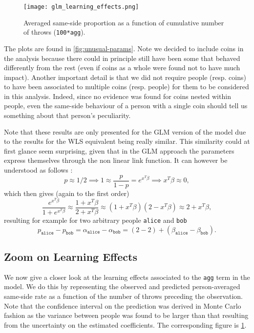 \documentclass[a4paper, 12pt,oneside]{article}
\begin{document}
		\begin{figure}[htb]
			\centering
			\texttt{[image: glm\_learning\_effects.png]}
			\caption{Averaged same-side proportion as a function of cumulative number of throws (\texttt{100*agg}).}
			\label{fig:learning-effects}
		\end{figure}
		The plots are found in \ref{fig:unusual-params}. Note we decided to include coins in the analysis because there could in principle still have been some that behaved differently from the rest (even if coins as a whole were found not to have much impact). 
		Another important detail is that we did not require people (resp. coins) to have been associated to multiple coins (resp. people) for them to be considered in this analysis. Indeed, since no evidence was found for coins nested within people, even the same-side behaviour of a person with a single coin should tell us something about that person's peculiarity.

		Note that these results are only presented for the GLM version of the model due to the results for the WLS equivalent being really similar. This similarity could at first glance seem surprising, given that in the GLM approach the parameters express themselves through the non linear link function. It can however be understood as follows :
		\begin{equation*}
			p\approx 1/2 \implies 1 \approx \frac{p}{1-p} 
									= e^{x^T \beta} \implies x^T\beta\approx 0,
		\end{equation*}
		which then gives (again to the first order)
		\begin{equation*}
			\frac{e^{x^T\beta}}{1+e^{x^T\beta}}\approx \frac{1+x^T\beta}{2+x^T\beta}
								\approx (1+x^T\beta)(2-x^T\beta) \approx 2 + x^T\beta,
		\end{equation*}
		resulting for example for two arbitrary people \texttt{alice} and \texttt{bob} 
		\begin{equation*}			
			p_{\texttt{alice}}-p_{\texttt{bob}}=\alpha_{\texttt{alice}} - \alpha_{\texttt{bob}}=(2-2)+(\beta_{\texttt{alice}} - \beta_{\texttt{bob}}).
		\end{equation*}
		\subsection{Zoom on Learning Effects}
			We now give a closer look at the learning effects associated to the \texttt{agg} term in the model. We do this by representing the observed and predicted person-averaged same-side rate as a function of the number of throws preceding the observation.  Note that the confidence interval on the prediction was derived in Monte Carlo fashion as the variance between people was found to be larger than that resulting from the uncertainty on the estimated coefficients. 
			The corresponding figure is \ref{fig:learning-effects}.
			
\end{document}
